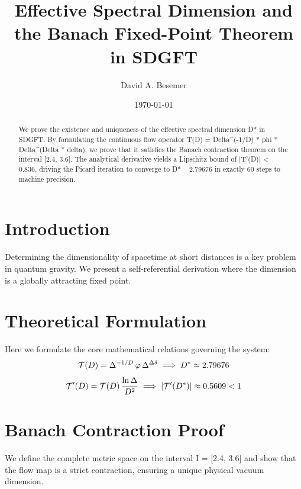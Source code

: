 \documentclass[amsmath,amssymb,aps,prd,twocolumn,superscriptaddress,nofootinbib]{revtex4-2}
\begin{document}

\title{Effective Spectral Dimension and the Banach Fixed-Point Theorem in SDGFT}

\author{David A. Besemer}

\date{\today}

\begin{abstract}
We prove the existence and uniqueness of the effective spectral dimension D* in SDGFT. By formulating the continuous flow operator T(D) = Delta^(-1/D) * phi * Delta^(Delta * delta), we prove that it satisfies the Banach contraction theorem on the interval [2.4, 3.6]. The analytical derivative yields a Lipschitz bound of |T'(D)| < 0.836, driving the Picard iteration to converge to D* ~ 2.79676 in exactly 60 steps to machine precision.
\end{abstract}

\maketitle

\section{Introduction}
Determining the dimensionality of spacetime at short distances is a key problem in quantum gravity. We present a self-referential derivation where the dimension is a globally attracting fixed point.

\section{Theoretical Formulation}
Here we formulate the core mathematical relations governing the system:
\begin{equation}
  \mathcal{T}(D) = \Delta^{-1/D}\,\varphi\,\Delta^{\Delta\delta} \implies D^{*} \approx 2.79676
\end{equation}
\begin{equation}
  \mathcal{T}'(D) = \mathcal{T}(D)\,\frac{\ln\Delta}{D^2} \implies \lvert\mathcal{T}'(D^{*})\rvert \approx 0.5609 < 1
\end{equation}
\section{Banach Contraction Proof}
We define the complete metric space on the interval I = [2.4, 3.6] and show that the flow map is a strict contraction, ensuring a unique physical vacuum dimension.
\end{document}
